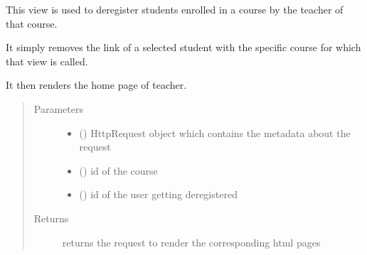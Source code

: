 \documentclass[letterpaper,10pt,english]{sphinxmanual}
\begin{document}
\begin{fulllineitems}
\label{\detokenize{users:users.views.deregister_view}}
\sphinxAtStartPar
This view is used to deregister students enrolled in a course by the teacher of that course.

\sphinxAtStartPar
It simply removes the link of a selected student with the specific course for which that view is called.

\sphinxAtStartPar
It then renders the home page of teacher.
\begin{quote}\begin{description}
\item[{Parameters}] \leavevmode\begin{itemize}
\item {} 
\sphinxAtStartPar
{} () \textendash{} HttpRequest object which contains the metadata about the request

\item {} 
\sphinxAtStartPar
{} () \textendash{} id of the course

\item {} 
\sphinxAtStartPar
{} () \textendash{} id of the user getting deregistered

\end{itemize}

\item[{Returns}] \leavevmode
\sphinxAtStartPar
returns the request to render the corresponding html pages

\end{description}\end{quote}

\end{fulllineitems}

\end{document}
